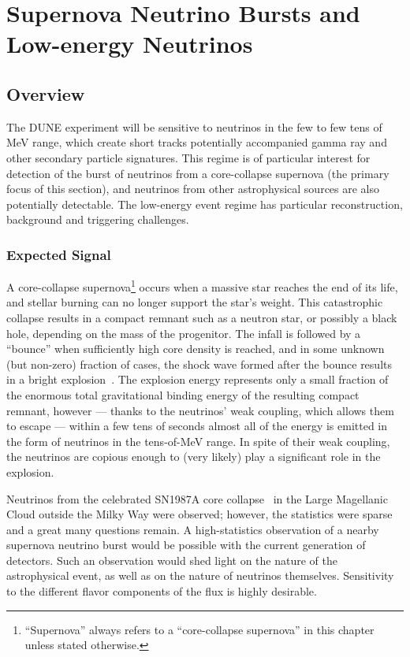 \chapter{Supernova Neutrino Bursts and Low-energy Neutrinos}
\label{ch:physics-snblowe}

\section{Overview}
\label{sec:physics-snblowe-overview}

The DUNE experiment will be sensitive to neutrinos in the few to few
tens of MeV range, which create short tracks potentially accompanied
gamma ray and other secondary particle signatures.  This regime is of
particular interest for detection of the burst of neutrinos from a
core-collapse supernova (the primary focus of this section), and
neutrinos from other astrophysical sources are also potentially detectable.
The low-energy event regime has particular reconstruction, background and triggering challenges.

\subsection{Expected  Signal}

A core-collapse supernova\footnote{``Supernova'' always
  refers to a ``core-collapse supernova'' in this chapter unless
  stated otherwise.} occurs when a massive star reaches the end of its
life, and stellar burning can no longer support the star's weight.
This catastrophic collapse results in a compact remnant such as a
neutron star, or possibly a black hole, depending on the mass of the
progenitor.  The infall is followed by a ``bounce'' when sufficiently
high core density is reached, and in some unknown (but non-zero)
fraction of cases, the shock wave formed after the bounce results in a
bright explosion~\cite{Janka:2012wk}.  The explosion energy represents
only a small fraction of the enormous total gravitational binding
energy of the resulting compact remnant, however --- thanks to the
neutrinos' weak coupling, which allows them to escape --- within a few
tens of seconds almost all of the energy is emitted in the form of
neutrinos in the tens-of-MeV range.  In spite of their weak coupling,
the neutrinos are copious enough to (very likely) play a significant
role in the explosion.

Neutrinos from the celebrated SN1987A core
collapse~\cite{Bionta:1987qt,Hirata:1987hu} in the Large Magellanic
Cloud outside the Milky Way were observed; however, the
statistics %
were sparse %
and a great many questions remain.  A high-statistics observation of a
nearby supernova neutrino burst would be possible with the current
generation of detectors. Such an observation would shed light
on %
the nature of the astrophysical event, as well as on the nature of
neutrinos themselves.  Sensitivity to the different flavor components
of the flux is highly desirable.

